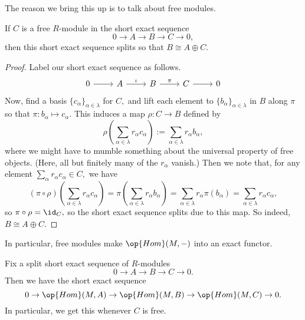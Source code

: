 \documentclass[../notes.tex]{subfiles}
\begin{document}
The reason we bring this up is to talk about free modules.
\begin{proposition} \label{prop:freeimpliessplit}
	If $C$ is a free $R$-module in the short exact sequence
	\[0\to A\to B\to C\to 0,\]
	then this short exact sequence splits so that $B\cong A\oplus C.$
\end{proposition}
\begin{proof}
	Label our short exact sequence as follows.
	\[\begin{tikzcd}
		0 & A & B & C & 0
		\arrow[from=1-1, to=1-2]
		\arrow["\iota", from=1-2, to=1-3]
		\arrow["\pi", from=1-3, to=1-4]
		\arrow[from=1-4, to=1-5]
	\end{tikzcd}\]
	Now, find a basis  $\{c_\alpha\}_{\alpha\in\lambda}$ for $C,$ and lift each element to $\{b_\alpha\}_{\alpha\in\lambda}$ in $B$ along $\pi$ so that $\pi:b_\alpha\mapsto c_\alpha.$ This induces a map $\rho:C\to B$ defined by
	\[\rho\left(\sum_{\alpha\in\lambda}r_\alpha c_\alpha\right):=\sum_{\alpha\in\lambda}r_\alpha b_\alpha,\]
	where we might have to mumble something about the universal property of free objects. (Here, all but finitely many of the $r_\alpha$ vanish.) Then we note that, for any element $\sum_\alpha r_\alpha c_\alpha\in C,$ we have
	\[(\pi\circ\rho)\left(\sum_{\alpha\in\lambda}r_\alpha c_\alpha\right)=\pi\left(\sum_{\alpha\in\lambda}r_\alpha b_\alpha\right)=\sum_{\alpha\in\lambda}r_\alpha\pi(b_\alpha)=\sum_{\alpha\in\lambda}r_\alpha c_\alpha,\]
	so $\pi\circ\rho=\id_C,$ so the short exact sequence splits due to this map. So indeed, $B\cong A\oplus C.$
\end{proof}
In particular, free modules make $\op{Hom}(M,-)$ into an exact functor.
\begin{proposition} \label{prop:hompreservessplit}
	Fix a split short exact sequence of $R$-modules
	\[0\to A\to B\to C\to 0.\]
	Then we have the short exact sequence
	\[0\to\op{Hom}(M,A)\to\op{Hom}(M,B)\to\op{Hom}(M,C)\to0.\]
	In particular, we get this whenever $C$ is free.
\end{proposition}
\end{document}

